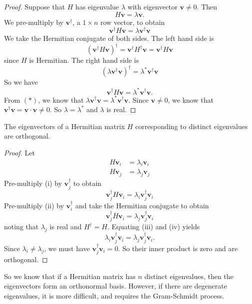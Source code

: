 \documentclass[a4paper]{article}
\begin{document}
  \begin{proof}
    Suppose that $H$ has eigenvalue $\lambda$ with eigenvector $\mathbf{v}\not= 0$. Then
    \[
      H\mathbf{v} = \lambda\mathbf{v}.
    \]
    We pre-multiply by $\mathbf{v}^\dagger$, a $1\times n$ row vector, to obtain
    \[
    \mathbf{v}^\dagger H\mathbf{v} = \lambda \mathbf{v}^\dagger \mathbf{v}\tag{$*$}\]
    We take the Hermitian conjugate of both sides. The left hand side is
    \[
      (\mathbf{v}^\dagger H\mathbf{v})^\dagger = \mathbf{v}^\dagger H^\dagger \mathbf{v} = \mathbf{v}^\dagger H \mathbf{v}
    \]
    since $H$ is Hermitian. The right hand side is
    \[
      (\lambda\mathbf{v}^\dagger\mathbf{v})^\dagger = \lambda^* \mathbf{v}^\dagger \mathbf{v}
    \]
    So we have
    \[
      \mathbf{v}^\dagger H\mathbf{v} = \lambda^* \mathbf{v}^\dagger \mathbf{v}.
    \]
    From $(*)$, we know that $\lambda \mathbf{v}^\dagger \mathbf{v} = \lambda^* \mathbf{v}^\dagger \mathbf{v}$. Since $\mathbf{v} \not= 0$, we know that $\mathbf{v}^\dagger \mathbf{v} = \mathbf{v}\cdot \mathbf{v} \not =0$. So $\lambda = \lambda^*$ and $\lambda$ is real.
  \end{proof}

  \begin{thm}
    The eigenvectors of a Hermitian matrix $H$ corresponding to distinct eigenvalues are orthogonal. 
  \end{thm}

  \begin{proof}
    Let
    \begin{align*}
      H\mathbf{v}_i &= \lambda_i\mathbf{v}_i\tag{i}\\
      H\mathbf{v}_j &= \lambda_j\mathbf{v}_j\tag{ii}
    \end{align*}
    Pre-multiply (i) by $\mathbf{v}_j^\dagger$ to obtain
    \[
      \mathbf{v}_j^\dagger H\mathbf{v}_i = \lambda_i \mathbf{v}_j^\dagger \mathbf{v}_i\tag{iii}
    \]
    Pre-multiply (ii) by $\mathbf{v}_i^\dagger$ and take the Hermitian conjugate to obtain
    \[
      \mathbf{v}_j^\dagger H\mathbf{v}_i = \lambda_j \mathbf{v}_j^\dagger \mathbf{v}_i\tag{iv}
    \]
    noting that $\lambda_j$ is real and $H^\dagger =H$. Equating (iii) and (iv) yields
    \[
      \lambda_i \mathbf{v}_j^\dagger \mathbf{v}_i = \lambda_j \mathbf{v}_j^\dagger \mathbf{v}_i.
    \]
    Since $\lambda_i\not= \lambda_j$, we must have $\mathbf{v}_j^\dagger\mathbf{v}_i = 0$. So their inner product is zero and are orthogonal. 
  \end{proof}

  So we know that if a Hermitian matrix has $n$ distinct eigenvalues, then the eigenvectors form an orthonormal basis. However, if there are degenerate eigenvalues, it is more difficult, and requires the Gram-Schmidt process.
\end{document}
